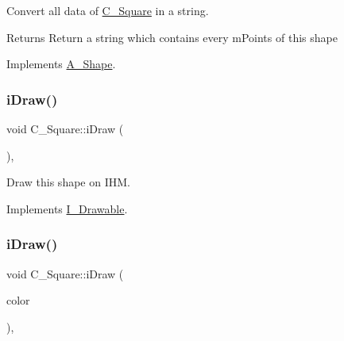 Convert all data of \hyperlink{classC__Square}{C\+\_\+\+Square} in a string. 

\begin{DoxyReturn}{Returns}
Return a string which contains every m\+Points of this shape 
\end{DoxyReturn}


Implements \hyperlink{classA__Shape_ad8804b4e74543db374af6892367b7c2e}{A\+\_\+\+Shape}.

\mbox{\label{classC__Square_ae6c51a7720576bcbb94b52584552df28}} 
\subsubsection{\texorpdfstring{i\+Draw()}{iDraw()}\hspace{0.1cm}{\footnotesize\ttfamily [1/2]}}
{\footnotesize\ttfamily void C\+\_\+\+Square\+::i\+Draw (\begin{DoxyParamCaption}{ }\end{DoxyParamCaption})\hspace{0.3cm}{\ttfamily [override]}, {\ttfamily [virtual]}}



Draw this shape on I\+HM. 



Implements \hyperlink{classI__Drawable_ae24c65000977a805f52ce032321cd86f}{I\+\_\+\+Drawable}.

\mbox{\label{classC__Square_a47a80c25bbeda17f17a8230127b4a5ed}} 
\subsubsection{\texorpdfstring{i\+Draw()}{iDraw()}\hspace{0.1cm}{\footnotesize\ttfamily [2/2]}}
{\footnotesize\ttfamily void C\+\_\+\+Square\+::i\+Draw (\begin{DoxyParamCaption}\item[{M\+L\+V\+\_\+\+Color}]{color }\end{DoxyParamCaption})\hspace{0.3cm}{\ttfamily [override]}, {\ttfamily [virtual]}}



